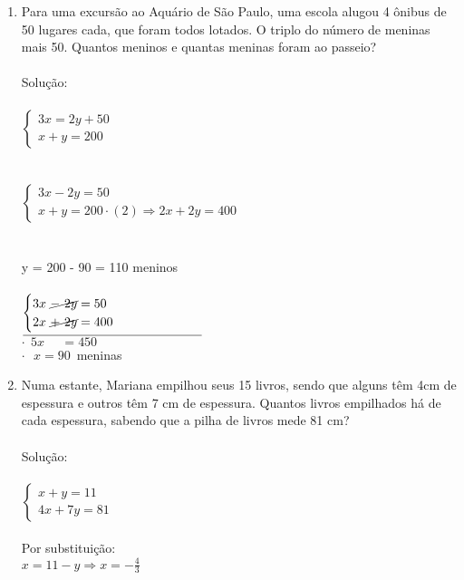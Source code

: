 \documentclass[a4paper,14pt]{article}
\begin{document}
\begin{multicols}{2}
\begin{enumerate}
		\item Para uma excursão ao Aquário de São Paulo, uma escola alugou 4 ônibus de 50 lugares cada, que foram todos lotados. O triplo do número de meninas mais 50. Quantos meninos e quantas meninas foram ao passeio?\\\\
		Solução: \\\\
		$\begin{cases}
			3x = 2y + 50 \\
			x + y = 200 
		\end{cases}$ \\\\\\
        $\begin{cases}
		    3x - 2y = 50 \\
		    x + y = 200 \cdot (2) \Rightarrow 2x + 2y = 400 
	    \end{cases}$ \\\\\\
        y = 200 - 90 = 110 meninos \\\\
        $\begin{cases}
        	3x~\cancel{-~2y} = 50 \\
        	2x~\cancel{+~2y} = 400
        \end{cases}$ \\
        $
        \underline{\hspace{5cm}} \\
        $ \\
        $\cdot~~5x ~~~~~~= 450$ \\
        $\cdot~~~x = 90$~meninas
		\item Numa estante, Mariana empilhou seus 15 livros, sendo que alguns têm 4cm de espessura e outros têm 7 cm de espessura. Quantos livros empilhados há de cada espessura, sabendo que a pilha de livros mede 81 cm? \\\\
		Solução: \\\\
		$\begin{cases}
			x + y = 11 \\
			4x + 7y = 81
		\end{cases}$ \\ \\
	    Por substituição: \\
	    $x = 11 - y \Rightarrow x = -\frac{4}{3}$\\\\

\end{enumerate}
\end{multicols}
\end{document}
